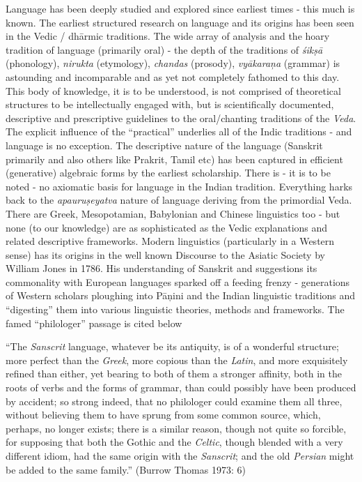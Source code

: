 Language has been deeply studied and explored since earliest times - this much is known. The earliest structured research on language and its origins has been seen in the Vedic / dhārmic traditions. The wide array of analysis and the hoary tradition of language (primarily oral) - the depth of the traditions of \textit{śikṣā} (phonology), \textit{nirukta} (etymology), \textit{chandas} (prosody), \textit{vyākaraņa} (grammar) is astounding and incomparable and as yet not completely fathomed to this day. This body of knowledge, it is to be understood, is not comprised of theoretical structures to be intellectually engaged with, but is scientifically documented, descriptive and prescriptive guidelines to the oral/chanting traditions of the \textit{Veda}. The explicit influence of the “practical” underlies all of the Indic traditions - and language is no exception. The descriptive nature of the language (Sanskrit primarily and also others like Prakrit, Tamil etc) has been captured in efficient (generative) algebraic forms by the earliest scholarship. There is - it is to be noted - no axiomatic basis for language in the Indian tradition. Everything harks back to the \textit{apauruṣeyatva} nature of language deriving from the primordial Veda. There are Greek, Mesopotamian, Babylonian and Chinese linguistics too - but none (to our knowledge) are as sophisticated as the Vedic explanations and related descriptive frameworks. Modern linguistics (particularly in a Western sense) has its origins in the well known Discourse to the Asiatic Society by William Jones in 1786. His understanding of Sanskrit and suggestions its commonality with European languages sparked off a feeding frenzy - generations of Western scholars ploughing into Pāņini and the Indian linguistic traditions and “digesting” them into various linguistic theories, methods and frameworks. The famed “philologer” passage is cited below

\vskip 2pt

\begin{myquote}
“The \textit{Sanscrit} language, whatever be its antiquity, is of a wonderful structure; more perfect than the \textit{Greek}, more copious than the \textit{Latin}, and more exquisitely refined than either, yet bearing to both of them a stronger affinity, both in the roots of verbs and the forms of grammar, than could possibly have been produced by accident; so strong indeed, that no philologer could examine them all three, without believing them to have sprung from some common source, which, perhaps, no longer exists; there is a similar reason, though not quite so forcible, for supposing that both the Gothic and the \textit{Celtic}, though blended with a very different idiom, had the same origin with the \textit{Sanscrit}; and the old \textit{Persian} might be added to the same family.” (Burrow Thomas 1973: 6)
\end{myquote}

